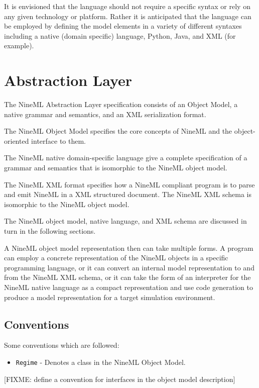 \documentclass[a4paper]{article}
\newcommand\nmlClass[1]{{\tt #1}}
\begin{document}
It is envisioned that the language should not require a
specific syntax or rely on any given technology or platform. 
Rather it is anticipated that the language can be
employed by defining the model elements in a variety of different
syntaxes including a native (domain specific) language, Python, Java, 
and XML (for example).


\section{Abstraction Layer}

The NineML Abstraction Layer specification consists of an Object
Model, a native grammar and semantics, and an XML serialization
format.

The NineML Object Model specifies the core concepts of NineML and the
object-oriented interface to them.

The NineML native domain-specific language give a complete specification
of a grammar and semantics that is isomorphic to the NineML object
model.

The NineML XML format specifies how a NineML compliant program is to
parse and emit NineML in a XML structured document.  The NineML XML
schema is isomorphic to the NineML object model.

The NineML object model, native language, and XML schema are discussed
in turn in the following sections.

A NineML object model representation then can take multiple forms.  A
program can employ a concrete representation of the NineML objects in
a specific programming language, or it can convert an internal model
representation to and from the NineML XML schema, or it can take the
form of an interpreter for the NineML native language as a compact
representation and use code generation to produce a model
representation for a target simulation environment.

\subsection{Conventions}

Some conventions which are followed: 

\begin{itemize}
\item \nmlClass{Regime} - Denotes a class in the NineML Object Model.
 
\end{itemize}

[FIXME: define a convention for interfaces in the object model description]
\end{document}
